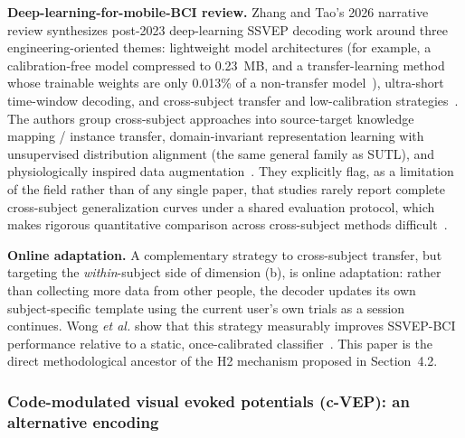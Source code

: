 \documentclass[11pt]{article}
\begin{document}
\textbf{Deep-learning-for-mobile-BCI review.} Zhang and Tao's 2026 narrative review synthesizes post-2023 deep-learning SSVEP decoding work around three engineering-oriented themes: lightweight model architectures (for example, a calibration-free model compressed to 0.23~MB, and a transfer-learning method whose trainable weights are only 0.013\% of a non-transfer model~\cite{zhang2026mobilereview}), ultra-short time-window decoding, and cross-subject transfer and low-calibration strategies~\cite{zhang2026mobilereview}. The authors group cross-subject approaches into source-target knowledge mapping / instance transfer, domain-invariant representation learning with unsupervised distribution alignment (the same general family as SUTL), and physiologically inspired data augmentation~\cite{zhang2026mobilereview}. They explicitly flag, as a limitation of the field rather than of any single paper, that studies rarely report complete cross-subject generalization curves under a shared evaluation protocol, which makes rigorous quantitative comparison across cross-subject methods difficult~\cite{zhang2026mobilereview}.

\textbf{Online adaptation.} A complementary strategy to cross-subject transfer, but targeting the \emph{within}-subject side of dimension (b), is online adaptation: rather than collecting more data from other people, the decoder updates its own subject-specific template using the current user's own trials as a session continues. Wong \textit{et al.} show that this strategy measurably improves SSVEP-BCI performance relative to a static, once-calibrated classifier~\cite{wong2022onlineadaptation}. This paper is the direct methodological ancestor of the H2 mechanism proposed in Section~4.2.

\subsubsection{Code-modulated visual evoked potentials (c-VEP): an alternative encoding}
\end{document}
